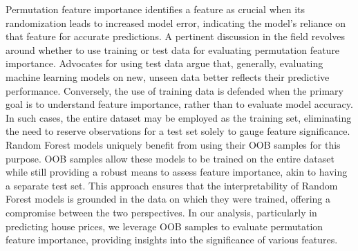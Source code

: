\documentclass[12pt]{article}
\begin{document}
Permutation feature importance identifies a feature as crucial when its randomization leads to increased model error, indicating the model's reliance on that feature for accurate predictions. A pertinent discussion in the field revolves around whether to use training or test data for evaluating permutation feature importance.
Advocates for using test data argue that, generally, evaluating machine learning models on new, unseen data better reflects their predictive performance. Conversely, the use of training data is defended when the primary goal is to understand feature importance, rather than to evaluate model accuracy. In such cases, the entire dataset may be employed as the training set, eliminating the need to reserve observations for a test set solely to gauge feature significance.
Random Forest models uniquely benefit from using their OOB samples for this purpose. OOB samples allow these models to be trained on the entire dataset while still providing a robust means to assess feature importance, akin to having a separate test set. This approach ensures that the interpretability of Random Forest models is grounded in the data on which they were trained, offering a compromise between the two perspectives.
In our analysis, particularly in predicting house prices, we leverage OOB samples to evaluate permutation feature importance, providing insights into the significance of various features.
\end{document}
